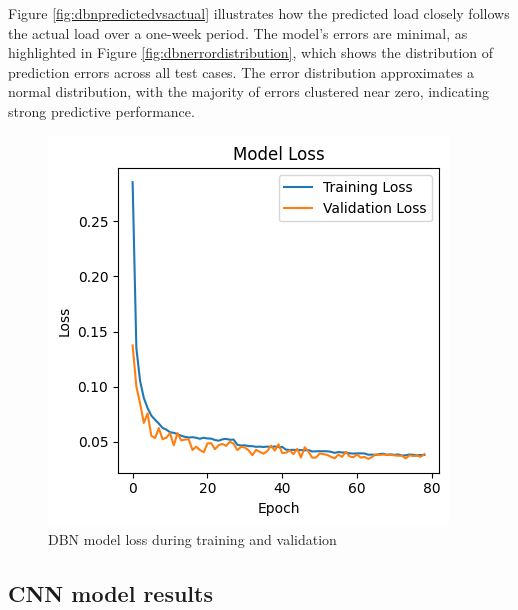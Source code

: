   Figure \ref{fig:dbnpredictedvsactual} illustrates how the predicted load closely follows the actual load over a one-week period. The model’s errors are minimal, as highlighted in Figure \ref{fig:dbnerrordistribution}, which shows the distribution of prediction errors across all test cases. The error distribution approximates a normal distribution, with the majority of errors clustered near zero, indicating strong predictive performance.   
  \begin{figure}[h]
  	\centering
  	\includegraphics[width=0.5\linewidth]{"Chapters/images/results/dbn_validation loss"}
  	\caption{DBN model loss during training and validation}
  	\label{fig:dbnvalidation-loss}
  \end{figure}
 
 
 \subsection{CNN model results}
 
